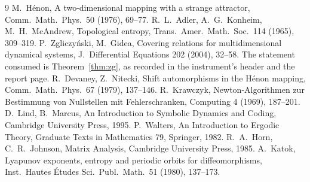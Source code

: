\documentclass[11pt]{article}
\begin{document}
\begin{thebibliography}{9}\footnotesize
{} M.~H\'enon, A two-dimensional mapping with a strange attractor, Comm.\ Math.\ Phys.\ 50 (1976),
69--77.
 R.~L.~Adler, A.~G.~Konheim, M.~H.~McAndrew, Topological entropy, Trans.\ Amer.\ Math.\ Soc.\ 114
(1965), 309--319.
 P.~Zgliczy\'nski, M.~Gidea, Covering relations for multidimensional dynamical systems, J.\ Differential
Equations 202 (2004), 32--58. The statement consumed is Theorem~\ref{thm:zg}, as recorded in the instrument's header
and the report page.
 R.~Devaney, Z.~Nitecki, Shift automorphisms in the H\'enon mapping, Comm.\ Math.\ Phys.\ 67 (1979),
137--146.
 R.~Krawczyk, Newton-Algorithmen zur Bestimmung von Nullstellen mit Fehlerschranken, Computing 4
(1969), 187--201.
 D.~Lind, B.~Marcus, An Introduction to Symbolic Dynamics and Coding, Cambridge University Press, 1995.
 P.~Walters, An Introduction to Ergodic Theory, Graduate Texts in Mathematics 79, Springer, 1982.
 R.~A.~Horn, C.~R.~Johnson, Matrix Analysis, Cambridge University Press, 1985.
 A.~Katok, Lyapunov exponents, entropy and periodic orbits for diffeomorphisms, Inst.\ Hautes
\'Etudes Sci.\ Publ.\ Math.\ 51 (1980), 137--173.
\end{thebibliography}
\end{document}
